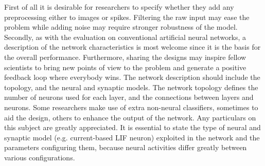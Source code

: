 First of all it is desirable for researchers to specify whether they add any preprocessing either to images or spikes.
Filtering the raw input may ease the problem while adding noise may require stronger robustness of the model.
Secondly, as with the evaluation on conventional artificial neural networks, a description of the network characteristics is most welcome since it is the basis for the overall performance.
Furthermore, sharing the designs may inspire fellow scientists to bring new points of view to the problem and generate a positive feedback loop where everybody wins.
The network description should include the topology, and the neural and synaptic models.
The network topology defines the number of neurons used for each layer, and the connections between layers and neurons.
Some researchers make use of extra non-neural classifiers, sometimes to aid the design, others to enhance the output of the network.
Any particulars on this subject are greatly appreciated.
It is essential to state the type of neural and synaptic model (e.g. current-based LIF neuron) exploited in the network and the parameters configuring them, because neural activities differ greatly between various configurations.
